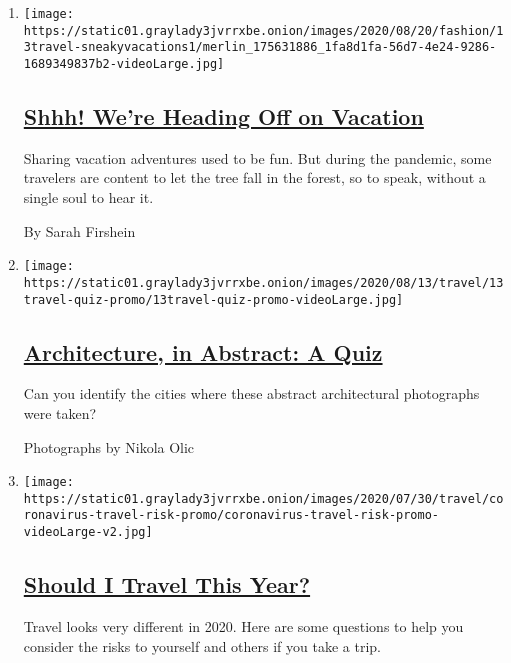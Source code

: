 \begin{enumerate}
\def\labelenumi{\arabic{enumi}.}
\item
  \texttt{[image: https://static01.graylady3jvrrxbe.onion/images/2020/08/20/fashion/13travel-sneakyvacations1/merlin\_175631886\_1fa8d1fa-56d7-4e24-9286-1689349837b2-videoLarge.jpg]}

  \hypertarget{shhh-were-heading-off-on-vacation}{%
  \subsection{\texorpdfstring{\href{/2020/08/14/travel/virus-secret-vacations.html}{Shhh!
  We're Heading Off on
  Vacation}}{Shhh! We're Heading Off on Vacation}}\label{shhh-were-heading-off-on-vacation}}

  Sharing vacation adventures used to be fun. But during the pandemic,
  some travelers are content to let the tree fall in the forest, so to
  speak, without a single soul to hear it.

  By Sarah Firshein
\item
  \texttt{[image: https://static01.graylady3jvrrxbe.onion/images/2020/08/13/travel/13travel-quiz-promo/13travel-quiz-promo-videoLarge.jpg]}

  \hypertarget{architecture-in-abstract-a-quiz}{%
  \subsection{\texorpdfstring{\href{/interactive/2020/08/13/travel/13travel-quiz.html}{Architecture,
  in Abstract: A
  Quiz}}{Architecture, in Abstract: A Quiz}}\label{architecture-in-abstract-a-quiz}}

  Can you identify the cities where these abstract architectural
  photographs were taken?

  Photographs by Nikola Olic
\item
  \texttt{[image: https://static01.graylady3jvrrxbe.onion/images/2020/07/30/travel/coronavirus-travel-risk-promo/coronavirus-travel-risk-promo-videoLarge-v2.jpg]}

  \hypertarget{should-i-travel-this-year}{%
  \subsection{\texorpdfstring{\href{/interactive/2020/07/31/travel/coronavirus-travel-risk.html}{Should
  I Travel This
  Year?}}{Should I Travel This Year?}}\label{should-i-travel-this-year}}

  Travel looks very different in 2020. Here are some questions to help
  you consider the risks to yourself and others if you take a trip.


\end{enumerate}
